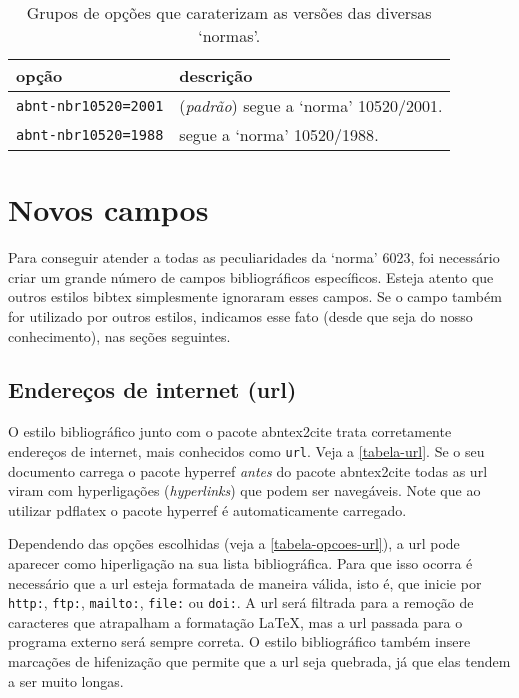 \documentclass[a4paper]{ltxdoc}
\begin{document}
\begin{table}[htbp]

\caption[Versão das `normas' a ser usada]{
Grupos de opções que caraterizam as versões das diversas `normas'.}
\label{tabela-versao-normas}

\begin{center}
\begin{tabular}{lp{9cm}}\hline\hline
opção & descrição \\ \hline
{\tt abnt-nbr10520=2001} & (\emph{padrão}) segue a `norma' 10520/2001\cite{NBR10520:2001}.\\
{\tt abnt-nbr10520=1988} & segue a `norma' 10520/1988\cite{NBR10520:1988}.\\
\hline\hline
\end{tabular}
\end{center}
\end{table}


\section{Novos campos}

Para conseguir atender a todas as peculiaridades da `norma'
6023\cite{NBR6023:2000}, foi necessário criar um grande número de campos
bibliográficos específicos. Esteja atento que outros estilos \textsf{bibtex}
simplesmente ignoraram esses campos. Se o campo também for utilizado por outros
estilos, indicamos esse fato (desde que seja do nosso conhecimento), nas seções
seguintes.

\subsection{Endereços de internet (url)}\label{sec-url}

O estilo bibliográfico junto com o pacote \textsf{abntex2cite} trata
corretamente endereços de internet, mais conhecidos como {\tt url}. Veja a
\autoref{tabela-url}. Se o seu documento carrega o pacote \textsf{hyperref}
\emph{antes} do pacote \textsf{abntex2cite} todas as url viram com hyperligações
(\emph{hyperlinks}) que podem ser navegáveis. Note que ao utilizar
\textsf{pdflatex} o pacote \textsf{hyperref} é automaticamente carregado.

Dependendo das opções escolhidas (veja a \autoref{tabela-opcoes-url}),
a url pode aparecer como hiperligação na sua lista bibliográfica. Para que isso
ocorra é necessário que a url esteja formatada de maneira válida, isto é, que inicie por
{\tt http:}, {\tt ftp:}, {\tt mailto:}, {\tt file:} ou {\tt doi:}. A url será
filtrada para a remoção de caracteres que atrapalham a formatação \LaTeX, mas a
url passada para o programa externo será sempre correta. O estilo bibliográfico
também insere marcações de hifenização que permite que a url seja quebrada, já
que elas tendem a ser muito longas.
\end{document}
